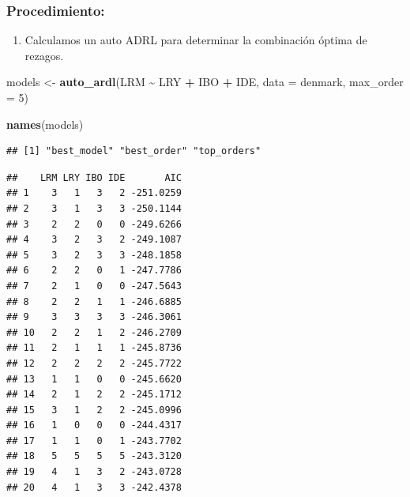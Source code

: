 \documentclass[
]{book}
\newenvironment{Shaded}{\begin{snugshade}}{\end{snugshade}}
\newcommand{\AttributeTok}[1]{\textcolor[rgb]{0.13,0.29,0.53}{#1}}
\newcommand{\CommentTok}[1]{\textcolor[rgb]{0.56,0.35,0.01}{\textit{#1}}}
\newcommand{\DecValTok}[1]{\textcolor[rgb]{0.00,0.00,0.81}{#1}}
\newcommand{\FunctionTok}[1]{\textcolor[rgb]{0.13,0.29,0.53}{\textbf{#1}}}
\newcommand{\NormalTok}[1]{#1}
\newcommand{\OtherTok}[1]{\textcolor[rgb]{0.56,0.35,0.01}{#1}}
\newcommand{\SpecialCharTok}[1]{\textcolor[rgb]{0.81,0.36,0.00}{\textbf{#1}}}
\providecommand{\tightlist}{%
  \setlength{\itemsep}{0pt}\setlength{\parskip}{0pt}}
\begin{document}
\hypertarget{procedimiento}{%
\subsubsection{Procedimiento:}\label{procedimiento}}

\begin{enumerate}
\def\labelenumi{\arabic{enumi}.}
\tightlist
\item
  Calculamos un auto ADRL para determinar la combinación óptima de
  rezagos.
\end{enumerate}

\begin{Shaded}
\begin{Highlighting}[]
\NormalTok{models }\OtherTok{\textless{}{-}} \FunctionTok{auto\_ardl}\NormalTok{(LRM }\SpecialCharTok{\textasciitilde{}}\NormalTok{ LRY }\SpecialCharTok{+}\NormalTok{ IBO }\SpecialCharTok{+}\NormalTok{ IDE, }\AttributeTok{data =}\NormalTok{ denmark, }\AttributeTok{max\_order =} \DecValTok{5}\NormalTok{)}

\FunctionTok{names}\NormalTok{(models)}
\end{Highlighting}
\end{Shaded}

\begin{verbatim}
## [1] "best_model" "best_order" "top_orders"
\end{verbatim}

\begin{Shaded}
\end{Shaded}

\begin{verbatim}
##    LRM LRY IBO IDE       AIC
## 1    3   1   3   2 -251.0259
## 2    3   1   3   3 -250.1144
## 3    2   2   0   0 -249.6266
## 4    3   2   3   2 -249.1087
## 5    3   2   3   3 -248.1858
## 6    2   2   0   1 -247.7786
## 7    2   1   0   0 -247.5643
## 8    2   2   1   1 -246.6885
## 9    3   3   3   3 -246.3061
## 10   2   2   1   2 -246.2709
## 11   2   1   1   1 -245.8736
## 12   2   2   2   2 -245.7722
## 13   1   1   0   0 -245.6620
## 14   2   1   2   2 -245.1712
## 15   3   1   2   2 -245.0996
## 16   1   0   0   0 -244.4317
## 17   1   1   0   1 -243.7702
## 18   5   5   5   5 -243.3120
## 19   4   1   3   2 -243.0728
## 20   4   1   3   3 -242.4378
\end{verbatim}
\end{document}

